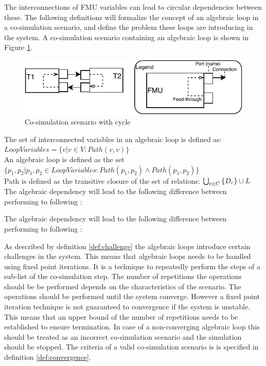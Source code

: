 The interconnections of FMU variables can lead to circular dependencies between these. The following definitions will formalize the concept of an algebraic loop in a co-simulation scenario, and define the problem these loops are introducing in the system. A co-simulation scenario containing an algebraic loop is shown in Figure \ref{fig:fmu_cycle}.

\begin{figure}
    \centering
    \includegraphics{images/fmu_cycle.pdf}
    \caption{Co-simulation scenario with cycle}
    \label{fig:fmu_cycle}
\end{figure}

\begin{definition} 
The set of interconnected variables in an algebraic loop is defined as: $LoopVariables = \{v | v \in V : Path(v,v)\}$ \\
An algebraic loop is defined as the set $\{p_1, p_2 | p_1, p_2 \in LoopVariables: Path(p_1, p_2) \land Path(p_1, p_2)\}$\\
Path is defined as the transitive closure of the set of relations: $\bigcup_{c \in C}  \left\{ D_{c} \right\} \cup L$\\
The algebraic dependency will lead to the following difference between performing to following :
\end{definition}


\begin{definition}\label{def:challenge}
The algebraic dependency will lead to the following difference between performing to following :
\end{definition}

As described by definition \ref{def:challenge} the algebraic loops introduce certain challenges in the system. This means that algebraic loops needs to be handled using fixed point iterations\cite{Gomes2018}. It is a technique to repeatedly perform the steps of a sub-list of the co-simulation step. The number of repetitions the operations should be be performed depends on the characteristics of the scenario. The operations should be performed until the system converge.
However a fixed point iteration technique is not guaranteed to convergence if the system is unstable. This means that an upper bound of the number of repetitions needs to be established to ensure termination. In case of a non-converging algebraic loop this should be treated as an incorrect co-simulation scenario and the simulation should be stopped. The criteria of a valid co-simulation scenario is is specified in definition \ref{def:convergence}.

